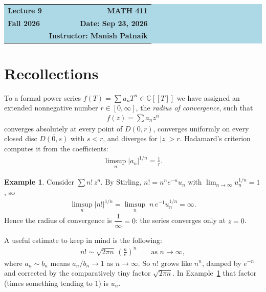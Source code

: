 \documentclass[11pt]{article}
\theoremstyle{plain}
\theoremstyle{definition}
\newtheorem{example}[theorem]{Example}
\theoremstyle{remark}
\numberwithin{equation}{section}
\newcommand{\be}{\begin{eqnarray}}
\newcommand{\ee}{\end{eqnarray}}
\newcommand{\C}{\mathbb{C}}
\newcommand{\CT}{\C[[T]]}
\begin{document}
\begin{center}
  \colorbox{lightblue}{%
    \begin{minipage}{0.94\textwidth}
      \vspace{0.55em}
      \begin{tabular*}{\textwidth}{@{\extracolsep{\fill}}lr}
        {\color{courseblue}\bfseries\LARGE Lecture 9} &
        {\color{courseblue}\bfseries\LARGE MATH 411}\\[0.35em]
        \textbf{Fall 2026} & \textbf{Date: Sep 23, 2026}\\
        & \textbf{Instructor: Manish Patnaik}
      \end{tabular*}
      \vspace{0.45em}
    \end{minipage}}
\end{center}

\setcounter{tocdepth}{1}
\tableofcontents
\vspace{0.45em}

\section{Recollections}
To a formal power series $f(T)=\sum a_nT^n\in\CT$ we have assigned an
extended nonnegative number $r\in[0,\infty]$, the \emph{radius of
convergence}, such that
\be
 f(z)=\sum a_nz^n
\ee
converges absolutely at every point of $D(0,r)$, converges uniformly on every
closed disc $\overline{D(0,s)}$ with $s<r$, and diverges for $|z|>r$.
Hadamard's criterion computes it from the coefficients:
\be
 \limsup_{n}|a_n|^{1/n}=\frac1r.
\ee

\begin{example}
\label{ex:nfactorial}
Consider $\sum n!\,z^n$. By Stirling, $n!=n^ne^{-n}u_n$ with
$\lim_{n\to\infty}u_n^{1/n}=1$, so
\be
 \limsup_{n}|n!|^{1/n}=\limsup_{n}\;n\,e^{-1}u_n^{1/n}=\infty.
\ee
Hence the radius of convergence is $\dfrac1\infty=0$: the series converges
only at $z=0$.
\end{example}

\begin{tcolorbox}[
  enhanced,
  colback=lightorange,
  colframe=orangeframe,
  coltitle=white,
  fonttitle=\bfseries,
  title={Stirling's formula},
  boxrule=0.7pt,
  arc=2pt,
  left=6pt,
  right=6pt,
  top=5pt,
  bottom=5pt
]
A useful estimate to keep in mind is the following:
\be 
 n!\sim\sqrt{2\pi n}\,\left(\frac ne\right)^{n}
 \qquad\text{as }n\to\infty,
\ee
where $a_n\sim b_n$ means $a_n/b_n\to1$ as $n \rightarrow \infty$. So $n!$ grows like $n^n$, damped by
$e^{-n}$ and corrected by the comparatively tiny factor $\sqrt{2\pi n}$. In
Example~\ref{ex:nfactorial} that factor (times something tending to $1$) is $u_n$. 

\end{tcolorbox}
\end{document}
